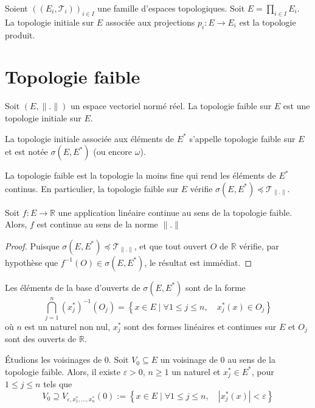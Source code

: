 \begin{ex}
  Soient $((E_i, \mathcal{T}_i))_{i\in I}$ une famille d'espaces topologiques.
  Soit $E = \prod_{i\in I} E_i$. La topologie initiale sur $E$ associée
  aux projections $p_i: E\to E_i$ est la topologie produit.
\end{ex}


\section{Topologie faible}
Soit $(E, \|.\|)$ un espace vectoriel normé réel. La topologie
faible sur $E$ est une topologie initiale sur $E$.
\begin{df}
  La topologie initiale associée aux éléments de $E^*$
  s'appelle topologie faible sur $E$ et est notée $\sigma(E, E^*)$
  (ou encore $\omega$).
\end{df}

La topologie faible est la topologie la moins fine qui rend les
éléments de $E^*$ continus. En particulier, la topologie faible
sur $E$ vérifie $\sigma(E, E^*)\preceq \mathcal{T}_{\|.\|}$.

\begin{lem}
  Soit $f: E\to\mathbb R$ une application linéaire
  continue au sens de la topologie faible. Alors,
  $f$ est continue au sens de la norme $\|.\|$
\end{lem}

\begin{proof}
  Puisque $\sigma(E, E^*)\preceq \mathcal{T}_{\|.\|}$, et
  que tout ouvert $O$ de $\mathbb R$ vérifie, par
  hypothèse que $f^{-1}(O)\in\sigma(E, E^*)$, le
  résultat est immédiat.
\end{proof}

Les éléments de la base d'ouverts de $\sigma(E, E^*)$ sont de la forme
\begin{equation*}
  \bigcap_{j=1}^n (x_j^*)^{-1}(O_j) =
  \left\{ x\in E\mid \forall 1\leq j\leq n,\quad x_j^*(x)\in O_j\right\}
\end{equation*}
où $n$ est un naturel non nul, $x_j^*$ sont des formes linéaires et continues
sur $E$ et $O_j$ sont des ouverts de $\mathbb R$.

\'{E}tudions les voisinages de $0$. Soit $V_0\subseteq E$ un voisinage
de $0$ au sens de la topologie faible. Alors, il existe $\varepsilon > 0$,
$n\geq 1$ un naturel et $x_j^*\in E^*$, pour $1\leq j\leq n$ tels que
\begin{equation*}
  V_0\supseteq V_{\varepsilon, x_1^*, \ldots, x_n^*}(0) :=
  \left\{ x\in E\mid \forall 1\leq j\leq n,\quad
    |x_j^*(x)| < \varepsilon\right\}
\end{equation*}

